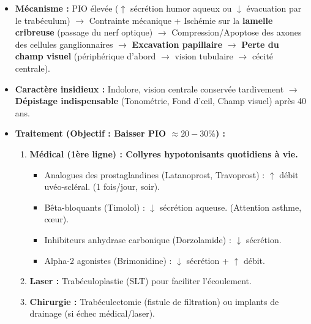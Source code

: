 \documentclass[11pt]{article}
\begin{document}
\begin{propriete}
\begin{itemize}
    \item \textbf{Mécanisme :} PIO élevée ($\uparrow$ sécrétion humor aqueux ou $\downarrow$ évacuation par le trabéculum) $\rightarrow$ Contrainte mécanique + Ischémie sur la \textbf{lamelle cribreuse} (passage du nerf optique) $\rightarrow$ Compression/Apoptose des axones des cellules ganglionnaires $\rightarrow$ \textbf{Excavation papillaire} $\rightarrow$ \textbf{Perte du champ visuel} (périphérique d'abord $\rightarrow$ vision tubulaire $\rightarrow$ cécité centrale).
    \item \textbf{Caractère insidieux :} Indolore, vision centrale conservée tardivement $\rightarrow$ \textbf{Dépistage indispensable} (Tonométrie, Fond d'œil, Champ visuel) après 40 ans.
    \item \textbf{Traitement (Objectif : Baisser PIO $\approx 20-30\%$) :}
    \begin{enumerate}
        \item \textbf{Médical (1ère ligne) : Collyres hypotonisants quotidiens à vie.}
        \begin{itemize}
            \item Analogues des prostaglandines (Latanoprost, Travoprost) : $\uparrow$ débit uvéo-scléral. (1 fois/jour, soir).
            \item Bêta-bloquants (Timolol) : $\downarrow$ sécrétion aqueuse. (Attention asthme, cœur).
            \item Inhibiteurs anhydrase carbonique (Dorzolamide) : $\downarrow$ sécrétion.
            \item Alpha-2 agonistes (Brimonidine) : $\downarrow$ sécrétion + $\uparrow$ débit.
        \end{itemize}
        \item \textbf{Laser :} Trabéculoplastie (SLT) pour faciliter l'écoulement.
        \item \textbf{Chirurgie :} Trabéculectomie (fistule de filtration) ou implants de drainage (si échec médical/laser).
    \end{enumerate}
\end{itemize}
\end{propriete}
\end{document}
